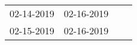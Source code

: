 \begin{supertabular}{llll}
 02-14-2019 &  02-16-2019 \\
 02-15-2019 &  02-16-2019 \\
\end{supertabular}
